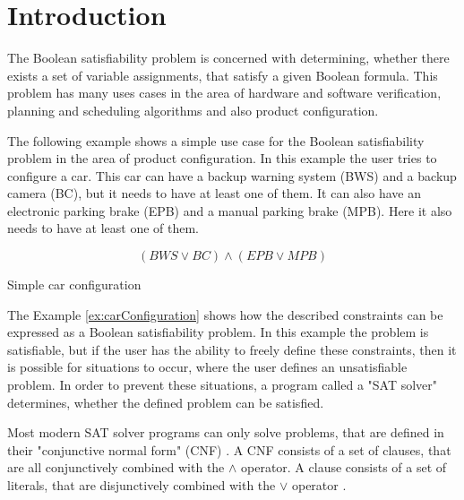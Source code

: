 
\chapter{Introduction}
\label{ch:Introduction}

The Boolean satisfiability problem is concerned with determining, whether there exists a set of variable assignments, that satisfy a given Boolean formula. This problem has many uses cases in the area of hardware and software verification, planning and scheduling algorithms and also product configuration. \cite{biere2009handbook}

The following example shows a simple use case for the Boolean satisfiability problem in the area of product configuration. In this example the user tries to configure a car. This car can have a backup warning system (BWS) and a backup camera (BC), but it needs to have at least one of them. It can also have an electronic parking brake (EPB) and a manual parking brake (MPB). Here it also needs to have at least one of them.
\begin{example}
\begin{leftbar}
\begin{displaymath}
(BWS \vee BC) \wedge (EPB \vee MPB)
\end{displaymath}
\end{leftbar}
\caption{Simple car configuration}
\label{ex:carConfiguration}
\end{example}

The Example \ref{ex:carConfiguration} shows how the described constraints can be expressed as a Boolean satisfiability problem. In this example the problem is satisfiable, but if the user has the ability to freely define these constraints, then it is possible for situations to occur, where the user defines an unsatisfiable problem. In order to prevent these situations, a program called a "SAT solver" determines, whether the defined problem can be satisfied.

Most modern SAT solver programs can only solve problems, that are defined in their "conjunctive normal form" (CNF) \cite{biere2009handbook}. A CNF consists of a set of clauses, that are all conjunctively combined with the $\wedge$ operator. A clause consists of a set of literals, that are disjunctively combined with the $\vee$ operator \cite{biere2009handbook}.

